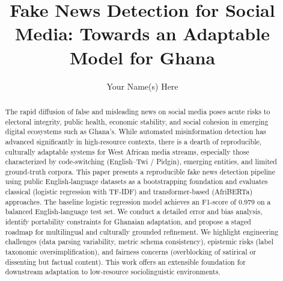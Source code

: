\documentclass[runningheads]{llncs}
\title{Fake News Detection for Social Media: Towards an Adaptable Model for Ghana}
\author{Your Name(s) Here}
\institute{Your Institution \\ \email{your-email@example.com}}
\begin{document}
\maketitle

\begin{abstract}
The rapid diffusion of false and misleading news on social media poses acute risks to electoral integrity, public health, economic stability, and social cohesion in emerging digital ecosystems such as Ghana’s. While automated misinformation detection has advanced significantly in high‑resource contexts, there is a dearth of reproducible, culturally adaptable systems for West African media streams, especially those characterized by code‑switching (English–Twi / Pidgin), emerging entities, and limited ground‑truth corpora. This paper presents a reproducible fake news detection pipeline using public English‑language datasets as a bootstrapping foundation and evaluates classical (logistic regression with TF‑IDF) and transformer‑based (AfriBERTa) approaches. The baseline logistic regression model achieves an F1‑score of 0.979 on a balanced English‑language test set. We conduct a detailed error and bias analysis, identify portability constraints for Ghanaian adaptation, and propose a staged roadmap for multilingual and culturally grounded refinement. We highlight engineering challenges (data parsing variability, metric schema consistency), epistemic risks (label taxonomic oversimplification), and fairness concerns (overblocking of satirical or dissenting but factual content). This work offers an extensible foundation for downstream adaptation to low‑resource sociolinguistic environments.
\end{abstract}
\end{document}
